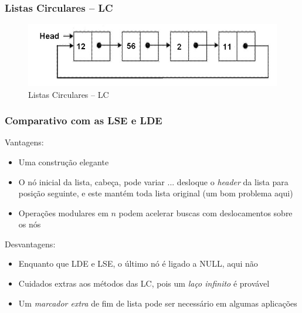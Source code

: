
\begin{frame}%

\frametitle{Listas Circulares -- LC}

\begin{figure}[!hb]
	\centering
\includegraphics[height=0.30\paperheight, width=0.9\paperwidth]
{figs/fig_listas/lista_circular.jpg}						
			\caption{Listas Circulares -- LC}	
		\end{figure} 

\end{frame} 

\begin{frame}
\frametitle{Comparativo com as LSE e LDE}

\begin{block}{Vantagens:}
\begin{itemize}
  \item Uma construção elegante
  \item O nó inicial da lista,  cabeça, pode variar ... desloque o \textit{header}  da lista 
  para   posição seguinte, e este mantém toda lista original (um bom problema aqui)
  
  \item Operações modulares em $n$ podem acelerar buscas com
  deslocamentos sobre os nós
\end{itemize}
\end{block}

\begin{block}{Desvantagens:}
\begin{itemize}
  \item Enquanto que LDE e LSE, o último nó é ligado a NULL, aqui não
  \item Cuidados extras aos métodos das LC, pois um \textit{laço infinito} é provável
  \item Um \textit{marcador extra} de fim de lista pode ser necessário em
  algumas aplicações
\end{itemize}
\end{block}
\end{frame} 

